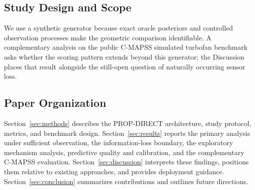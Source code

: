 \subsection{Study Design and Scope}

We use a synthetic generator because exact oracle posteriors and controlled observation processes make the geometric comparison identifiable. A complementary analysis on the public C-MAPSS simulated turbofan benchmark asks whether the scoring pattern extends beyond this generator; the Discussion places that result alongside the still-open question of naturally occurring sensor loss.

\subsection{Paper Organization}

Section~\ref{sec:methods} describes the PROP-DIRECT architecture, study protocol, metrics, and benchmark design. Section~\ref{sec:results} reports the primary analysis under sufficient observation, the information-loss boundary, the exploratory mechanism analysis, predictive quality and calibration, and the complementary C-MAPSS evaluation. Section~\ref{sec:discussion} interprets these findings, positions them relative to existing approaches, and provides deployment guidance. Section~\ref{sec:conclusion} summarizes contributions and outlines future directions.
